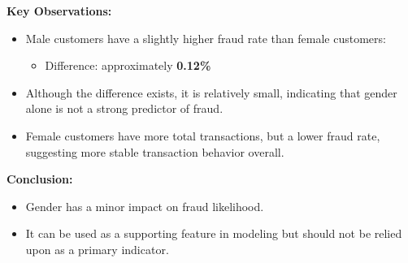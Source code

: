 \textbf{Key Observations:}
\begin{itemize}
    \item Male customers have a slightly higher fraud rate than female customers:
    \begin{itemize}
        \item Difference: approximately \textbf{0.12\%}
    \end{itemize}
    
    \item Although the difference exists, it is relatively small, indicating that gender alone is not a strong predictor of fraud.
    
    \item Female customers have more total transactions, but a lower fraud rate, suggesting more stable transaction behavior overall.
\end{itemize}

\textbf{Conclusion:}
\begin{itemize}
    \item Gender has a minor impact on fraud likelihood.
    \item It can be used as a supporting feature in modeling but should not be relied upon as a primary indicator.
\end{itemize}